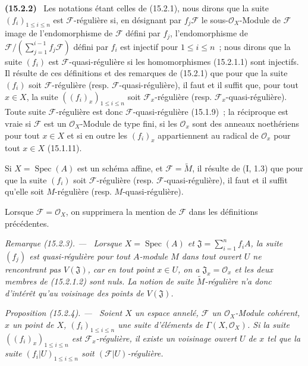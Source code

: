 \documentclass[10pt,oneside]{book}
\makeatletter
\newcommand{\setmanualcurrentlabel}[1]{\def\@currentlabel{#1}}
\newenvironment{env}[1][]{\setmanualcurrentlabel{#1}\par\medskip\noindent\textbf{(#1)}\ }{\par}
\newenvironment{proposition}[1][]{%
  \setmanualcurrentlabel{#1}\par\medskip\noindent\itshape Proposition (#1). ---\ }{\par}
\newenvironment{remark}[1][]{%
  \setmanualcurrentlabel{#1}\par\medskip\noindent\itshape Remarque (#1). ---\ }{\par}
\makeatother
\begin{document}
\begin{env}[15.2.2]
\label{0.15.2.2-fr}
Les notations étant celles de (15.2.1), nous dirons que la suite
$(f_i)_{1\leq i\leq n}$ est $\mathscr{F}$-régulière si, en désignant par
$f_j\mathscr{F}$ le sous-$\mathcal{O}_X$-Module de $\mathscr{F}$ image de
l'endomorphisme de $\mathscr{F}$ défini par $f_j$, l'endomorphisme de
$\mathscr{F}/(\sum_{j=1}^{i-1}f_j\mathscr{F})$ défini par $f_i$ est injectif
pour $1\leq i\leq n$~; nous dirons que la suite $(f_i)$ est
$\mathscr{F}$-quasi-régulière si les homomorphismes (15.2.1.1) sont injectifs.
Il résulte de ces définitions et des remarques de (15.2.1) que pour que la
suite $(f_i)$ soit $\mathscr{F}$-régulière (resp.
$\mathscr{F}$-quasi-régulière), il faut et il suffit que, pour tout $x\in X$,
la suite $((f_i)_x)_{1\leq i\leq n}$ soit $\mathscr{F}_x$-régulière (resp.
$\mathscr{F}_x$-quasi-régulière). Toute suite $\mathscr{F}$-régulière est donc
$\mathscr{F}$-quasi-régulière (15.1.9)~; la réciproque est vraie si
$\mathscr{F}$ est un $\mathcal{O}_X$-Module de type fini, si les
$\mathcal{O}_x$ sont des anneaux noethériens pour tout $x\in X$ et si en outre
les $(f_i)_x$ appartiennent au radical de $\mathcal{O}_x$ pour tout $x\in X$
(15.1.11).

Si $X=\operatorname{Spec}(A)$ est un schéma affine, et
$\mathscr{F}=\widetilde{M}$, il
résulte de (I, 1.3) que pour que la suite $(f_i)$ soit
$\mathscr{F}$-régulière (resp. $\mathscr{F}$-quasi-régulière), il faut et il
suffit qu'elle soit $M$-régulière (resp. $M$-quasi-régulière).

Lorsque $\mathscr{F}=\mathcal{O}_X$, on supprimera la mention de
$\mathscr{F}$ dans les définitions précédentes.
\end{env}

\begin{remark}[15.2.3]
\label{0.15.2.3-fr}
Lorsque $X=\operatorname{Spec}(A)$ et
$\mathfrak{J}=\sum_{i=1}^n f_iA$, la suite $(f_j)$ est
quasi-régulière pour tout $A$-module $M$ dans tout ouvert $U$ ne rencontrant
pas $V(\mathfrak{J})$, car en tout point $x\in U$, on a
$\mathfrak{J}_x=\mathcal{O}_x$ et les deux membres de (15.2.1.2) sont nuls. La
notion de suite $\widetilde{M}$-régulière n'a donc d'intérêt qu'au voisinage
des points de $V(\mathfrak{J})$.
\end{remark}

\begin{proposition}[15.2.4]
\label{0.15.2.4-fr}
Soient $X$ un espace annelé, $\mathscr{F}$ un $\mathcal{O}_X$-Module cohérent,
$x$ un point de $X$, $(f_i)_{1\leq i\leq n}$ une suite d'éléments de
$\Gamma(X,\mathcal{O}_X)$. Si la suite $((f_i)_x)_{1\leq i\leq n}$ est
$\mathscr{F}_x$-régulière, il existe un voisinage ouvert $U$ de $x$ tel que la
suite $(f_i|U)_{1\leq i\leq n}$ soit $(\mathscr{F}|U)$-régulière.
\end{proposition}
\end{document}
